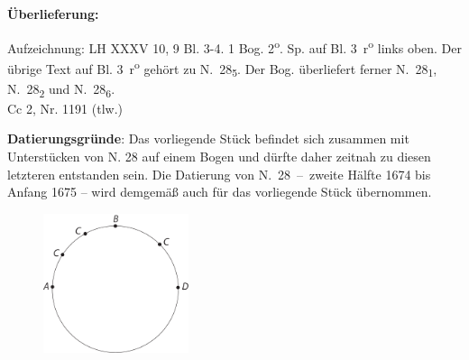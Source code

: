 \begin{ledgroupsized}[r]{120mm}
\footnotesize 
\pstart 
\noindent\textbf{\"{U}berlieferung:}
\pend
\end{ledgroupsized}
\begin{ledgroupsized}[r]{114mm}
\footnotesize 
\pstart \parindent -6mm
Aufzeichnung:
LH XXXV 10, 9 Bl. 3-4. 1 Bog. 2\textsuperscript{o}.
 Sp. auf Bl. 3~r\textsuperscript{o} links oben.
Der übrige Text auf Bl. 3~r\textsuperscript{o} gehört zu N.~28\textsubscript{5}. %
Der Bog. überliefert ferner N.~28\textsubscript{1}, %
N.~28\textsubscript{2} %
und N.~28\textsubscript{6}.%
\\%
Cc 2, Nr. 1191 (tlw.)
\pend
\end{ledgroupsized}
%
\vspace*{5mm}
\begin{ledgroup}
\footnotesize 
\pstart
\noindent\footnotesize{\textbf{Datierungsgr\"{u}nde}: Das vorliegende Stück befindet sich zusammen mit Unterstücken von N. 28 %
auf einem Bogen und dürfte daher zeitnah zu diesen letzteren entstanden sein.
Die Datierung von %
N.~28~--~zweite Hälfte 1674 bis Anfang 1675 -- wird demgemäß auch für das vorliegende Stück übernommen.}
\pend
\end{ledgroup}
%
\vspace*{8mm}
\pstart 
\normalsize
\begin{figure}  
\vspace{-5mm}\includegraphics[trim = 0mm -3mm -4mm 0mm, clip, width=0.38\textwidth]{images/lh0351009_003r-d1.pdf}\\
\end{figure}

